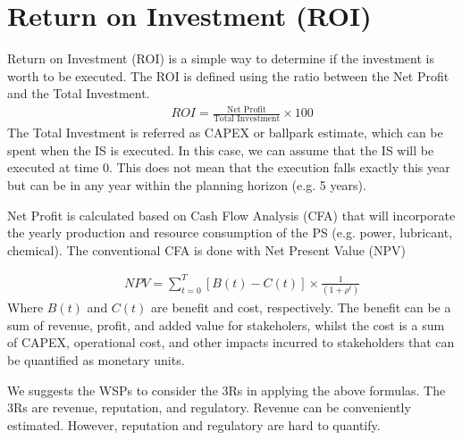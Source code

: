 \section{Return on Investment (ROI)}
Return on Investment (ROI) is a simple way to determine if the investment is worth to be executed. The ROI is defined using the ratio between the Net Profit and the Total Investment.
\begin{eqnarray}
&& ROI = \frac{\text{Net Profit}}{\text{Total Investment}}\times 100
\end{eqnarray}
The Total Investment is referred as CAPEX or ballpark estimate, which can be spent when the IS is executed. In this case, we can assume that the IS will be executed at time 0. This does not mean that the execution falls exactly this year but can be in any year within the planning horizon (e.g. 5 years).

Net Profit is calculated based on Cash Flow Analysis (CFA) that will incorporate the yearly production and resource consumption of the PS (e.g. power, lubricant, chemical). The conventional CFA is done with Net Present Value (NPV)

\begin{eqnarray}
&& NPV = \sum_{t=0}^{T} \left[B(t) - C(t)\right]\times \frac{1}{(1+\rho^t)}
\end{eqnarray}
Where $B(t)$ and $C(t)$ are benefit and cost, respectively. The benefit can be a sum of revenue, profit, and added value for stakeholers, whilst the cost is a sum of CAPEX, operational cost, and other impacts incurred to stakeholders that can be quantified as monetary units.

We suggests the WSPs to consider the 3Rs in applying the above formulas. The 3Rs are revenue, reputation, and regulatory. Revenue can be conveniently estimated. However, reputation and regulatory are hard to quantify. 
